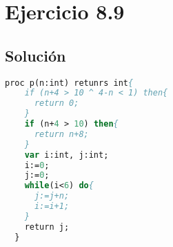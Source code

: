 \documentclass[11pt, a4paper, titlepage]{article}
\begin{document}
\section*{Ejercicio 8.9}
\subsection*{Solución}
\begin{lstlisting}[language=pascal]
  proc p(n:int) retunrs int{
    if (n+4 > 10 ^ 4-n < 1) then{
      return 0;
    }
    if (n+4 > 10) then{
      return n+8;
    }
    var i:int, j:int;
    i:=0;
    j:=0;
    while(i<6) do{
      j:=j+n;
      i:=i+1;
    }
    return j;
  }
\end{lstlisting}
\end{document}
